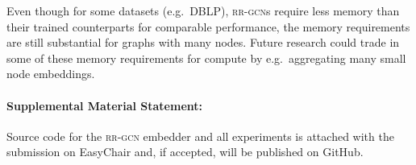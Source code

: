 \documentclass{llncs}
\begin{document}
Even though for some datasets (e.g.~DBLP), \textsc{rr-gcn}s require less memory than their trained counterparts for comparable performance, the memory requirements are still substantial for graphs with many nodes. Future research could trade in some of these memory requirements for compute by e.g.~aggregating many small node embeddings.

\paragraph*{Supplemental Material Statement:} Source code for the \textsc{rr-gcn} embedder and all experiments is attached with the submission on EasyChair and, if accepted, will be published on GitHub.

\newpage


\end{document}
